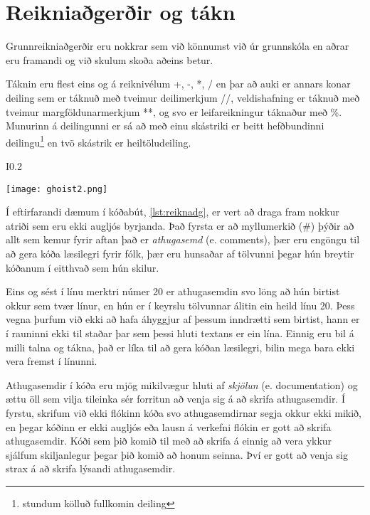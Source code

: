 \section{Reikniaðgerðir og tákn}\label{uk:tolur-reiknivirkjar}
Grunnreikniaðgerðir eru nokkrar sem við könnumst við úr grunnskóla en aðrar eru framandi og við skulum skoða aðeins betur.

Táknin eru flest eins og á reiknivélum +, -, *, / en þar að auki er annars konar deiling sem er táknuð með tveimur deilimerkjum //, veldishafning er táknuð með tveimur margföldunarmerkjum **, og svo er leifareikningur táknaður með \%.
Munurinn á deilingunni er sá að með einu skástriki er beitt hefðbundinni deilingu\footnote{stundum kölluð fullkomin deiling} en tvö skástrik er heiltöludeiling.
\begin{wrapfigure}{I}{0.2\textwidth}
	\begin{center}
		\texttt{[image: ghoist2.png]}
	\end{center}
\end{wrapfigure}

Í eftirfarandi dæmum í kóðabút, \ref{lst:reiknadg}, er vert að draga fram nokkur atriði sem eru ekki augljós byrjanda. 
Það fyrsta er að myllumerkið (\#) þýðir að allt sem kemur fyrir aftan það er \textit{athugasemd} (e. comments), þær eru engöngu til að gera kóða læsilegri fyrir fólk, þær eru hunsaðar af tölvunni þegar hún breytir kóðanum í eitthvað sem hún skilur.

Eins og sést í línu merktri númer 20 er athugasemdin svo löng að hún birtist okkur sem tvær línur, en hún er í keyrslu tölvunnar álitin ein heild línu 20.
Þess vegna þurfum við ekki að hafa áhyggjur af þessum inndrætti sem birtist, hann er í rauninni ekki til staðar þar sem þessi hluti textans er ein lína.
Einnig eru bil á milli talna og tákna, það er líka til að gera kóðan læsilegri, bilin mega bara ekki vera fremst í línunni.

Athugasemdir í kóða eru mjög mikilvægur hluti af \emph{skjölun} (e. documentation) og ættu öll sem vilja tileinka sér forritun að venja sig á að skrifa athugasemdir.
Í fyrstu, skrifum við ekki flókinn kóða svo athugasemdirnar segja okkur ekki mikið, en þegar kóðinn er ekki augljós eða lausn á verkefni flókin er gott að skrifa athugasemdir.
Kóði sem þið komið til með að skrifa á einnig að vera ykkur sjálfum skiljanlegur þegar þið komið að honum seinna.
Því er gott að venja sig strax á að skrifa lýsandi athugasemdir. 

